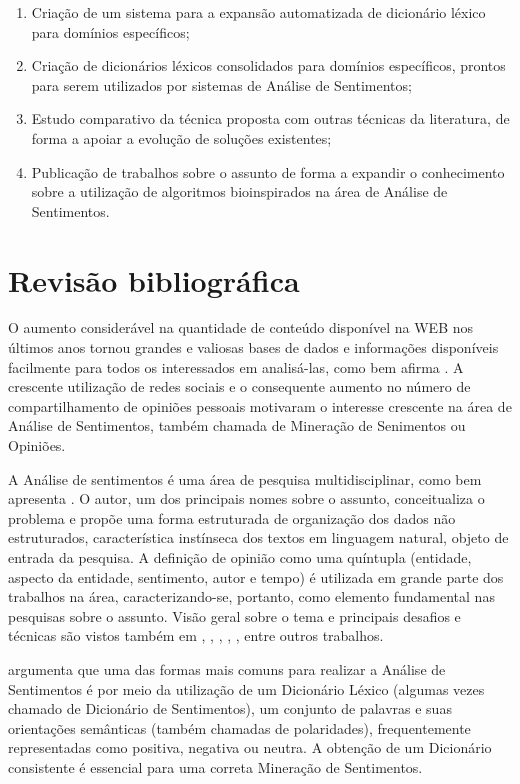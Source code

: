 \documentclass[a4paper,11pt]{article}
\begin{document}
\begin{enumerate}
\item Criação de um sistema para a expansão automatizada de dicionário léxico para domínios específicos;
\item Criação de dicionários léxicos consolidados para domínios específicos, prontos para serem utilizados por sistemas de Análise de Sentimentos;
\item Estudo comparativo da técnica proposta com outras técnicas da literatura, de forma a apoiar a evolução de soluções existentes;
\item Publicação de trabalhos sobre o assunto de forma a expandir o conhecimento sobre a utilização de algoritmos bioinspirados na área de Análise de Sentimentos.

\end{enumerate}

\section{Revisão bibliográfica}
\label{sec:bibl}
O aumento considerável na quantidade de conteúdo disponível na WEB nos últimos anos tornou grandes e valiosas bases de dados e informações disponíveis facilmente para todos os interessados em analisá-las, como bem afirma \cite{kdir16}. A crescente utilização de redes sociais e o consequente aumento no número de compartilhamento de opiniões pessoais motivaram o interesse crescente na área de Análise de Sentimentos, também chamada de Mineração de Senimentos ou Opiniões. 

A Análise de sentimentos é uma área de pesquisa multidisciplinar, como bem apresenta \cite{liu2010multifaceted}. O autor, um dos principais nomes sobre o assunto, conceitualiza o problema e propõe uma forma estruturada de organização dos dados não estruturados, característica instínseca dos textos em linguagem natural, objeto de entrada da pesquisa. A definição de opinião como uma quíntupla (entidade, aspecto da entidade, sentimento, autor e tempo) é utilizada em grande parte dos trabalhos na área, caracterizando-se, portanto, como elemento fundamental nas pesquisas sobre o assunto. Visão geral sobre o tema e principais desafios e técnicas são vistos também em \cite{mohammad2016challenges}, \cite{ghaleb2016survey}, \cite{kdir16}, \cite{taboada2011lexicon}, \cite{bandhakavi2016lexicon}, entre outros trabalhos.

\cite{kdir16} argumenta que uma das formas mais comuns para realizar a Análise de Sentimentos é por meio da utilização de um Dicionário Léxico (algumas vezes chamado de Dicionário de Sentimentos), um conjunto de palavras e suas orientações semânticas (também chamadas de polaridades), frequentemente representadas como positiva, negativa ou neutra. A obtenção de um Dicionário consistente é essencial para uma correta Mineração de Sentimentos. 
\end{document}
